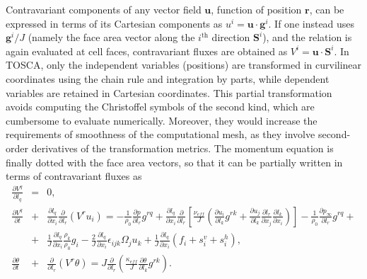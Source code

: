 \documentclass[journal abbreviation, manuscript]{copernicus}
\begin{document}
Contravariant components of any vector field $\mathbf{u}$, function of position $\mathbf{r}$, can be expressed in terms of its Cartesian components as $u^i=\mathbf{u}\cdot\mathbf{g}^i$. If one instead uses $\mathbf{g}^i/J$ (namely the face area vector along the $i^{\text{th}}$ direction $\mathbf{S}^i$), and the relation is again evaluated at cell faces, contravariant fluxes are obtained as $V^i = \mathbf{u}\cdot \mathbf{S}^i$. In TOSCA, only the independent variables (positions) are transformed in curvilinear coordinates using the chain rule and integration by parts, while dependent variables are retained in Cartesian coordinates. This partial transformation avoids computing the Christoffel symbols of the second kind, which are cumbersome to evaluate numerically. Moreover, they would increase the requirements of smoothness of the computational mesh, as they involve second-order derivatives of the transformation metrics. The momentum equation is finally dotted with the face area vectors, so that it can be partially written in terms of contravariant fluxes as
\begin{eqnarray}
	\frac{\partial V^q}{\partial l_q} &=& 0, \label{eq:massCurvilinear} \\
	\frac{\partial V^q}{\partial t} &+& \frac{\partial l_q}{\partial x_i} \frac{\partial}{\partial l_r}\left(V^r u_i\right) = -\frac{1}{\rho_0}\frac{\partial p}{\partial l_r}g^{rq} + \frac{\partial l_q}{\partial x_i} \frac{\partial}{\partial l_r}\left[\frac{\nu_{eff}}{J}\left(\frac{\partial u_i}{\partial l_k} g^{rk} + \frac{\partial u_j}{\partial l_k}\frac{\partial l_r}{\partial x_j}\frac{\partial l_k}{\partial x_i}\right)\right] - \frac{1}{\rho_0}\frac{\partial p_{\infty}}{\partial l_r}g^{rq} + \nonumber \\
	&+& \frac{1}{J}\frac{\partial l_q}{\partial x_i}\frac{\rho_k}{\rho_0}g_i - \frac{2}{J}\frac{\partial l_q}{\partial x_i}\epsilon_{ijk}\Omega_j u_k + \frac{1}{J}\frac{\partial l_q}{\partial x_i}\left(f_i + s^v_i + s^h_i\right), \label{eq:momentumCurvilinear} \\
	\frac{\partial \theta}{\partial t} &+& \frac{\partial}{\partial l_r}\left(V^r \theta\right) = J\frac{\partial}{\partial l_r}\left(\frac{\kappa_{eff}}{J}\frac{\partial \theta}{\partial l_k} g^{rk}\right). \label{eq:temperatureCurvilinear}
\end{eqnarray}
\end{document}
